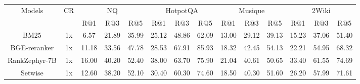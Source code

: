 \documentclass{applemlr}
\numberwithin{equation}{section}
\begin{document}
\begin{table}[!htbp]
\centering
\scriptsize
\begin{tabular}{c|c|ccc|ccc|ccc|ccc}
\hline
\multirow{2}{*}{Models} & \multirow{2}{*}{CR} 
& \multicolumn{3}{c|}{NQ} 
& \multicolumn{3}{c|}{HotpotQA} 
& \multicolumn{3}{c|}{Musique} 
& \multicolumn{3}{c}{2Wiki} 
 \\
\cline{3-14}
& & R@1 & R@3 & R@5 
  & R@1 & R@3 & R@5 
  & R@1 & R@3 & R@5 
  & R@1 & R@3 & R@5 
\\
\hline
BM25 &1x& 6.57 & 21.89 & 35.99 & 25.12 & 48.86 & 62.09 & 13.00 & 29.12 & 39.13 & 15.23 & 37.06 & 51.40 \\
BGE-reranker &1x &11.18 & 33.56 & 47.78 & 28.53 & 67.91 & 85.93 & 18.32 & 42.45 & 54.13 & 22.21 & 54.95 & 68.32 \\
RankZephyr-7B&1x & 16.00 & 40.20 & 52.40 & 38.00 & 63.70 & 75.90 & 21.04 & 40.61 & 50.65 & 33.40 & 61.55 & 74.69 \\

Setwise & 1x& 12.60 & 38.20 & 52.10 & 30.40 & 60.30 & 74.60 & 18.50 & 40.30 & 51.60 & 26.20 & 57.99 & 71.61 \\


\end{tabular}
\end{table}
\end{document}
